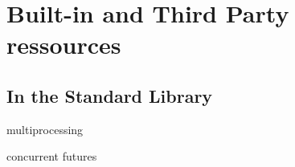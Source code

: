 \documentclass[13pt, usenames,dvipsnames]{beamer} %
\begin{document}








\section{Built-in and Third Party ressources}
    \subsection{In the Standard Library}
        \begin{frame}[t]{multiprocessing}

        \end{frame}
        \begin{frame}[t]{concurrent futures}

        \end{frame}
\end{document}
